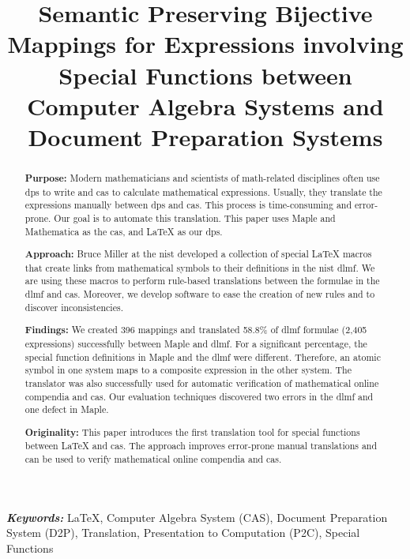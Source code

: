 \documentclass[a4paper,11pt]{article}
\title{
	Semantic Preserving Bijective Mappings for Expressions involving Special Functions between Computer Algebra Systems and Document Preparation Systems
}
\date{}
\newcommand{\Maple}{Maple}
\newcommand{\Mathematica}{Mathematica}
\theoremstyle{defTheoStyle}
\theoremstyle{defExampStyle}
\begin{document}
	\maketitle
	\thispagestyle{firststyle}
	\begin{abstract}
		\glsresetall
		\noindent
		\textbf{Purpose:} Modern mathematicians and scientists of math-related disciplines often use \gls*{dps} to write and \gls*{cas} to calculate mathematical expressions. Usually, they translate the expressions manually between \gls*{dps} and \gls*{cas}. This process is time-consuming and error-prone. Our goal is to automate this translation. This paper uses \Maple{} and \Mathematica{} as the \gls*{cas}, and \LaTeX{} as our \gls*{dps}.
		
		\noindent\textbf{Approach:} Bruce Miller at the \gls*{nist} developed a collection of special \LaTeX{} macros that create links from mathematical symbols to their definitions in the \gls*{nist} \gls*{dlmf}. We are using these macros to perform rule-based translations between the formulae in the \gls*{dlmf} and \gls*{cas}. Moreover, we develop software to ease the creation of new rules and to discover inconsistencies.
		
		\noindent\textbf{Findings:} We created 396 mappings and translated 58.8\% of \gls*{dlmf} formulae (2,405 expressions) successfully between \Maple{} and \gls*{dlmf}. For a significant percentage, the special function definitions in \Maple{} and the \gls*{dlmf} were different. Therefore, an atomic symbol in one system maps to a composite expression in the other system. The translator was also successfully used for automatic verification of mathematical online compendia and \gls*{cas}. Our evaluation techniques discovered two errors in the \gls*{dlmf} and one defect in \Maple.
		
		\noindent\textbf{Originality:} This paper introduces the first translation tool for special functions between \LaTeX{} and \gls*{cas}. The approach improves error-prone manual translations and can be used to verify mathematical online compendia and \gls*{cas}.
	\end{abstract} \glsresetall
	
	\noindent
	{\it \bf Keywords:} \LaTeX, Computer Algebra System (CAS), Document Preparation System (D2P), Translation, Presentation to Computation (P2C), Special Functions
	
	
\end{document}
